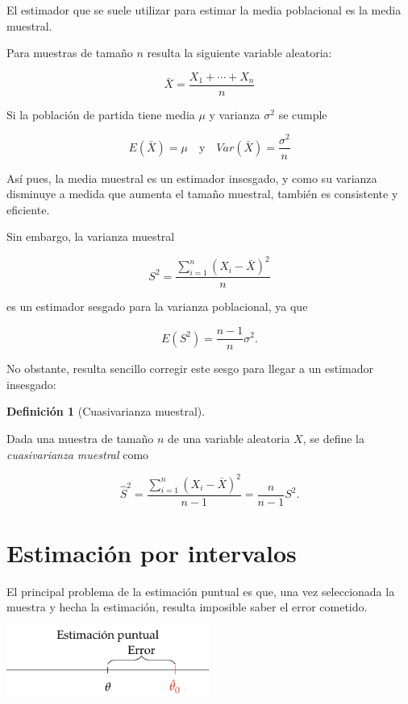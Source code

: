 \documentclass[
  a4paper,
]{scrreport}
\theoremstyle{plain}
\theoremstyle{definition}
\theoremstyle{definition}
\newtheorem{definition}{Definición}[chapter]
\theoremstyle{remark}
\begin{document}
El estimador que se suele utilizar para estimar la media poblacional es
la media muestral.

Para muestras de tamaño \(n\) resulta la siguiente variable aleatoria:

\[
\bar X = \frac{X_1+\cdots+X_n}{n}
\]

Si la población de partida tiene media \(\mu\) y varianza \(\sigma^2\)
se cumple

\[
E(\bar X) = \mu \quad \mbox{y} \quad Var(\bar X)=\frac{\sigma^2}{n}
\]

Así pues, la media muestral es un estimador insesgado, y como su
varianza disminuye a medida que aumenta el tamaño muestral, también es
consistente y eficiente.

Sin embargo, la varianza muestral

\[
S^2 = \frac{\sum_{i=1}^n (X_i-\bar X)^2}{n}
\]

es un estimador sesgado para la varianza poblacional, ya que

\[
E(S^2)= \frac{n-1}{n}\sigma^2.
\]

No obstante, resulta sencillo corregir este sesgo para llegar a un
estimador insesgado:

\begin{definition}[Cuasivarianza
muestral]\protect\hypertarget{def-cuasivarianza-muestral}{}\label{def-cuasivarianza-muestral}

Dada una muestra de tamaño \(n\) de una variable aleatoria \(X\), se
define la \emph{cuasivarianza muestral} como

\[
\hat{S}^2 = \frac{\sum_{i=1}^n (X_i-\bar X)^2}{n-1} = \frac{n}{n-1}S^2.
\]

\end{definition}

\section{Estimación por intervalos}\label{estimaciuxf3n-por-intervalos}

El principal problema de la estimación puntual es que, una vez
seleccionada la muestra y hecha la estimación, resulta imposible saber
el error cometido.

\begin{center}
\includegraphics[width=0.5\textwidth,height=\textheight]{img/estimacion/error-estimacion-puntual.pdf}
\end{center}
\end{document}
